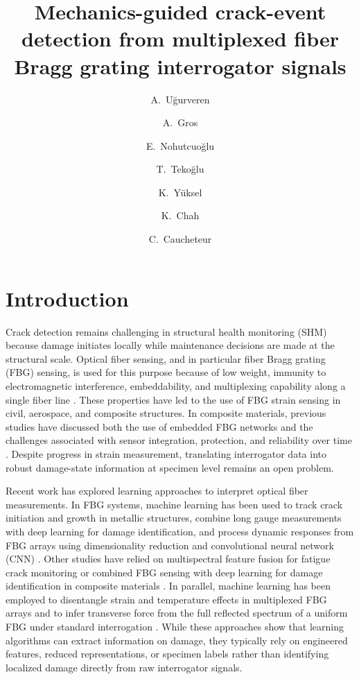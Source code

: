 \documentclass[fleqn,10pt]{wlscirep}
\title{Mechanics-guided crack-event detection from multiplexed fiber Bragg grating interrogator signals}
\author[a,c]{A.~Uğurveren}
\author[a]{A.~Gros}
\author[a,c]{E.~Nohutcuoğlu}
\author[a,c]{T.~Tekoğlu}
\author[c]{K.~Yüksel}
\author[a]{K.~Chah}
\author[a,b,*]{C.~Caucheteur}
\affil[a]{Electromagnetism and Telecommunication Department, UMONS, Mons, 7000, Belgium}
\affil[b]{WEL Research Institute, Avenue Pasteur, 6, 1300 Wavre, Belgium}
\affil[c]{FISENS, Izmir Institute of Technology, Urla, 35430, Türkiye}
\affil[*]{christophe.caucheteur@umons.ac.be}
\begin{document}
\flushbottom
\maketitle
\thispagestyle{empty}

\section*{Introduction}

Crack detection remains challenging in structural health monitoring (SHM) because damage initiates locally while maintenance decisions are made at the structural scale. Optical fiber sensing, and in particular fiber Bragg grating (FBG) sensing, is used for this purpose because of low weight, immunity to electromagnetic interference, embeddability, and multiplexing capability along a single fiber line \cite{ye2014,yassin2024,golovastikov2025}. These properties have led to the use of FBG strain sensing in civil, aerospace, and composite structures. In composite materials, previous studies have discussed both the use of embedded FBG networks and the challenges associated with sensor integration, protection, and reliability over time \cite{kinet2014,gabardi2023}. Despite progress in strain measurement, translating interrogator data into robust damage-state information at specimen level remains an open problem.

Recent work has explored learning approaches to interpret optical fiber measurements. In FBG systems, machine learning has been used to track crack initiation and growth in metallic structures, combine long gauge measurements with deep learning for damage identification, and process dynamic responses from FBG arrays using dimensionality reduction and convolutional neural network (CNN) \cite{chilelli2019,zhang2020,wang2023}. Other studies have relied on multispectral feature fusion for fatigue crack monitoring or combined FBG sensing with deep learning for damage identification in composite materials \cite{zhao2025,xiong2025}. In parallel, machine learning has been employed to disentangle strain and temperature effects in multiplexed FBG arrays \cite{saha2025} and to infer transverse force from the full reflected spectrum of a uniform FBG under standard interrogation \cite{tocanne2025}.  While these approaches show that learning algorithms can extract information on damage, they typically rely on engineered features, reduced representations, or specimen labels rather than identifying localized damage directly from raw interrogator signals.
\end{document}
